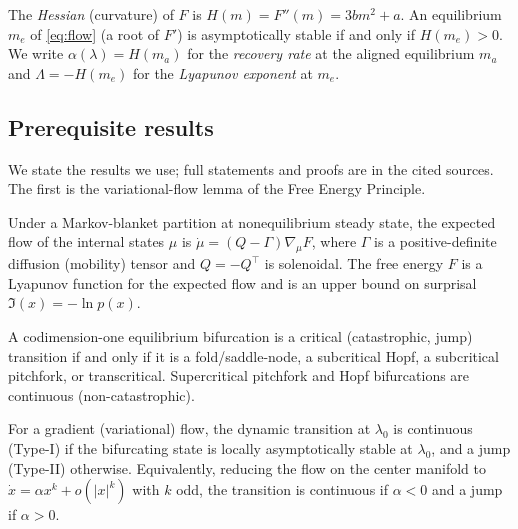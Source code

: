 \begin{definition}\label{def:curv}
The \emph{Hessian} (curvature) of $F$ is $H(m)=F''(m)=3bm^2+a$. An equilibrium $m_e$ of
\eqref{eq:flow} (a root of $F'$) is asymptotically stable if and only if $H(m_e)>0$. We write
$\alpha(\lambda)=H(m_a)$ for the \emph{recovery rate} at the aligned equilibrium $m_a$ and
$\Lambda=-H(m_e)$ for the \emph{Lyapunov exponent} at $m_e$.
\end{definition}

\subsection{Prerequisite results}

We state the results we use; full statements and proofs are in the cited sources. The first is
the variational-flow lemma of the Free Energy Principle.

\begin{theorem}\label{thm:fep}
Under a Markov-blanket partition at nonequilibrium steady state, the expected flow of the
internal states $\mu$ is $\dot\mu=(Q-\Gamma)\nabla_\mu F$, where $\Gamma$ is a positive-definite
diffusion (mobility) tensor and $Q=-Q^\top$ is solenoidal. The free energy $F$ is a Lyapunov
function for the expected flow and is an upper bound on surprisal $\Im(x)=-\ln p(x)$.
\end{theorem}

\begin{theorem}\label{thm:kuehn}
A codimension-one equilibrium bifurcation is a critical (catastrophic, jump) transition if and
only if it is a fold/saddle-node, a subcritical Hopf, a subcritical pitchfork, or
transcritical. Supercritical pitchfork and Hopf bifurcations are continuous (non-catastrophic).
\end{theorem}

\begin{theorem}\label{thm:mawang}
For a gradient (variational) flow, the dynamic transition at $\lambda_0$ is continuous
(Type-I) if the bifurcating state is locally asymptotically stable at $\lambda_0$, and a jump
(Type-II) otherwise. Equivalently, reducing the flow on the center manifold to
$\dot x=\alpha x^k+o(|x|^k)$ with $k$ odd, the transition is continuous if $\alpha<0$ and a jump
if $\alpha>0$.
\end{theorem}

